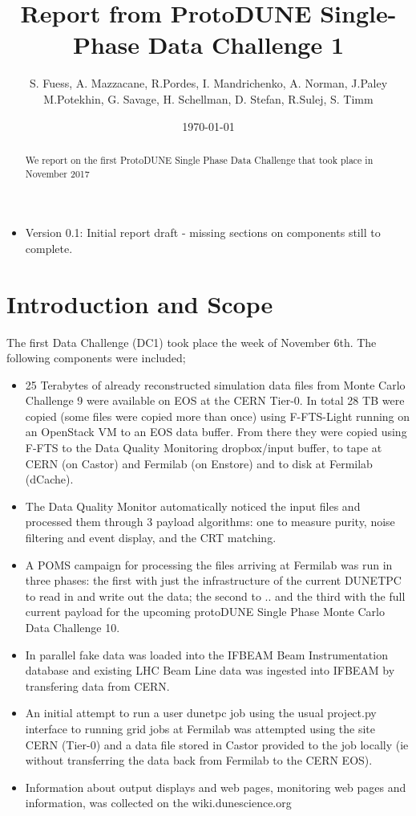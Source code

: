 \documentclass[pdftex,12pt,letter]{article}
\title{Report from ProtoDUNE Single-Phase Data Challenge 1}
\date{\today}
\author{S. Fuess, A. Mazzacane, R.Pordes, I. Mandrichenko, A. Norman, J.Paley \\
M.Potekhin, G. Savage, H. Schellman, D. Stefan, R.Sulej, S. Timm}
\begin{document}
\maketitle
\begin{abstract}
\noindent We report on the first ProtoDUNE Single Phase Data Challenge that took place in November 2017
\end{abstract}


\begin{itemize}
\item Version 0.1: Initial report draft - missing sections on components still to complete.
\clearpage
\end{itemize}

\tableofcontents
\pagebreak



\section{Introduction and Scope}

The first Data Challenge  (DC1) took place the week of November 6th. The following components were included; 



\begin{itemize}
\item 25 Terabytes of already reconstructed simulation data files from Monte Carlo Challenge 9 were available on EOS at the CERN Tier-0. In total 28 TB  were copied (some files were copied more than once) using F-FTS-Light running on an OpenStack VM to an EOS data buffer. From there they were copied using F-FTS to the Data Quality Monitoring dropbox/input buffer, to tape at CERN (on Castor) and Fermilab (on Enstore) and to disk at Fermilab (dCache). 

\item  The Data Quality Monitor automatically noticed the input files and processed them through 3 payload algorithms: one to measure purity, noise filtering and event display, and the CRT matching. 
\item A POMS campaign for processing the files arriving at Fermilab was run in three phases: the first with just the infrastructure of the current DUNETPC to read in and write out the data; the second to .. and the third with the full current payload for the upcoming protoDUNE Single Phase Monte Carlo Data Challenge 10. 
\item In parallel fake data was loaded into the IFBEAM Beam Instrumentation database and existing LHC Beam Line data was ingested into IFBEAM by transfering data from CERN. 
\item An initial attempt to run a user dunetpc job using the  usual project.py interface to running grid jobs at Fermilab was attempted using the site CERN (Tier-0) and a data file stored in Castor provided to the job locally (ie without transferring the data back from Fermilab to the CERN EOS). 
\item Information about output displays and web pages, monitoring web pages and information, was collected on the wiki.dunescience.org
\end{itemize}
\end{document}
